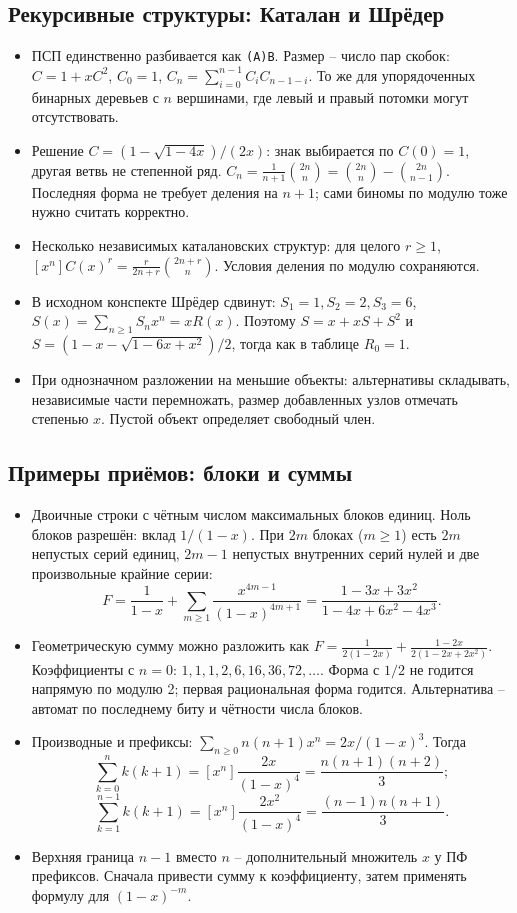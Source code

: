 \subsection{Рекурсивные структуры: Каталан и Шрёдер}
\begin{itemize}[leftmargin=*, nosep]
\item ПСП единственно разбивается как \verb|(A)B|. Размер -- число пар скобок: $C=1+xC^2$, $C_0=1$, $C_n=\sum_{i=0}^{n-1}C_iC_{n-1-i}$. То же для упорядоченных бинарных деревьев с $n$ вершинами, где левый и правый потомки могут отсутствовать.
\item Решение $C=(1-\sqrt{1-4x})/(2x)$: знак выбирается по $C(0)=1$, другая ветвь не степенной ряд. $C_n=\frac1{n+1}\binom{2n}n=\binom{2n}n-\binom{2n}{n-1}$. Последняя форма не требует деления на $n+1$; сами биномы по модулю тоже нужно считать корректно.
\item Несколько независимых каталановских структур: для целого $r\ge1$, $[x^n]C(x)^r=\frac{r}{2n+r}\binom{2n+r}n$. Условия деления по модулю сохраняются.
\item В исходном конспекте Шрёдер сдвинут: $S_1=1,S_2=2,S_3=6$, $S(x)=\sum_{n\ge1}S_nx^n=xR(x)$. Поэтому $S=x+xS+S^2$ и $S=(1-x-\sqrt{1-6x+x^2})/2$, тогда как в таблице $R_0=1$.
\item При однозначном разложении на меньшие объекты: альтернативы складывать, независимые части перемножать, размер добавленных узлов отмечать степенью $x$. Пустой объект определяет свободный член.
\end{itemize}

\subsection{Примеры приёмов: блоки и суммы}
\begin{itemize}[leftmargin=*, nosep]
\item Двоичные строки с чётным числом максимальных блоков единиц. Ноль блоков разрешён: вклад $1/(1-x)$. При $2m$ блоках ($m\ge1$) есть $2m$ непустых серий единиц, $2m-1$ непустых внутренних серий нулей и две произвольные крайние серии:
\[
F=\frac1{1-x}+\sum_{m\ge1}\frac{x^{4m-1}}{(1-x)^{4m+1}}
=\frac{1-3x+3x^2}{1-4x+6x^2-4x^3}.
\]
\item Геометрическую сумму можно разложить как $F=\frac1{2(1-2x)}+\frac{1-2x}{2(1-2x+2x^2)}$. Коэффициенты с $n=0$: $1,1,1,2,6,16,36,72,\ldots$. Форма с $1/2$ не годится напрямую по модулю 2; первая рациональная форма годится. Альтернатива -- автомат по последнему биту и чётности числа блоков.
\item Производные и префиксы: $\sum_{n\ge0}n(n+1)x^n=2x/(1-x)^3$. Тогда
\[
\sum_{k=0}^n k(k+1)=[x^n]\frac{2x}{(1-x)^4}=\frac{n(n+1)(n+2)}3;
\]
\[
\sum_{k=1}^{n-1}k(k+1)=[x^n]\frac{2x^2}{(1-x)^4}=\frac{(n-1)n(n+1)}3.
\]
\item Верхняя граница $n-1$ вместо $n$ -- дополнительный множитель $x$ у ПФ префиксов. Сначала привести сумму к коэффициенту, затем применять формулу для $(1-x)^{-m}$.
\end{itemize}

